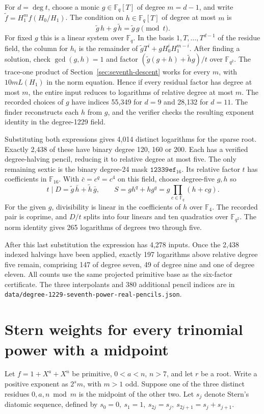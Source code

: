 \documentclass[11pt]{article}
\begin{document}
For \(d=\deg t\), choose a monic \(g\in\mathbb F_q[T]\) of degree
\(m=d-1\), and write \(\widetilde f=H_1^m f(H_0/H_1)\). The
condition on \(h\in\mathbb F_q[T]\) of degree at most \(m\) is
\[
           \widetilde g\,h+g\,\widetilde h
                  = \widetilde g\,g \pmod{t}.
\]
For fixed \(g\) this is a linear system over \(\mathbb F_q\).
In the basis \(1,T,\ldots,T^{d-1}\) of the residue field, the
column for \(h_i\) is the remainder of
\(\widetilde g T^i +g H_0^i H_1^{m-i}\). After finding a solution,
check \(\gcd(g,h)=1\) and factor
\((\widetilde g(g+h)+\widetilde h g)/t\) over \(\mathbb F_{q^2}\).
The trace-one product of Section~\ref{sec:seventh-descent} works for
every \(m\), with \(10mL(H_1)\) in the norm equation. Hence if every
residual factor has degree at most \(m\), the entire input reduces
to logarithms of relative degree at most \(m\). The recorded choices
of \(g\) have indices 55,349 for \(d=9\) and 28,132 for \(d=11\).
The finder reconstructs each \(h\) from \(g\), and the verifier
checks the resulting exponent identity in the degree-1229 field.

Substituting both expressions gives 4,014 distinct logarithms for
the sparse root. Exactly 2,438 of these have binary degree
120, 160 or 200. Each has a verified degree-halving pencil, reducing
it to relative degree at most five. The only remaining sextic is the
binary degree-24 mask \(\mathtt{12339ef}_{16}\). Its relative factor
\(t\) has coefficients in \(\mathbb F_{16}\). With
\(\bar c=c^q=c^4\) on this field, choose degree-five \(g,h\) so
\[
  t\mid D=\widetilde g\,\bar h+\widetilde h\,\bar g,\qquad
  S=g h^q+h g^q=g\prod_{c\in\mathbb F_q}(h+cg).
\]
For the given \(g\), divisibility is linear in the coefficients of
\(h\) over \(\mathbb F_4\). The recorded pair is coprime, and \(D/t\)
splits into four linears and ten quadratics over \(\mathbb F_{q^2}\).
The norm identity gives 265 logarithms of degrees two through five.

After this last substitution the expression has 4,278 inputs. Once
the 2,438 indexed halvings have been applied, exactly 197 logarithms
above relative degree five remain, comprising 147 of degree seven,
49 of degree nine and one of degree eleven. All counts use the same projected
primitive base as the six-factor certificate.
The three interpolants and 380 additional pencil indices are in
\nolinkurl{data/degree-1229-seventh-power-real-pencils.json}.

\section{Stern weights for every trinomial power with a midpoint}
\label{sec:stern-midpoint}
Let \(f=1+X^a+X^n\) be primitive, \(0<a<n\), \(n>7\), and let
\(r\) be a root. Write a positive exponent as \(2^s m\), with \(m>1\)
odd. Suppose one of the three distinct residues \(0,a,n\bmod m\) is
the midpoint of the other two. Let \(s_j\) denote Stern's diatomic
sequence, defined by \(s_0=0,\ s_1=1,\ s_{2j}=s_j,\
s_{2j+1}=s_j+s_{j+1}\).
\end{document}
